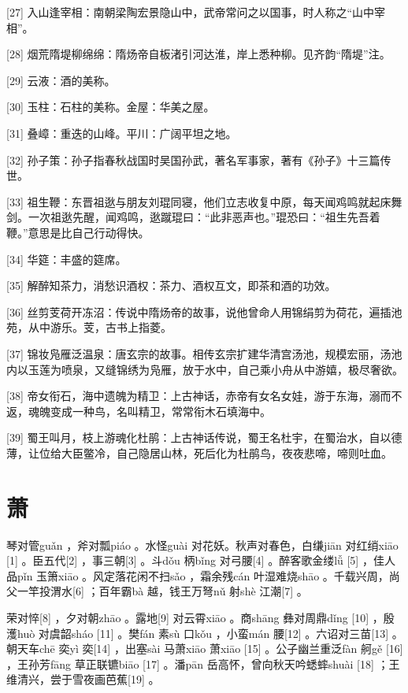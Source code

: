 \documentclass[12pt,UTF8]{ctexbook}
\begin{document}
[27] 入山逢宰相：南朝梁陶宏景隐山中，武帝常问之以国事，时人称之“山中宰相”。

[28] 烟荒隋堤柳绵绵：隋炀帝自板渚引河达淮，岸上悉种柳。见齐韵“隋堤”注。

[29] 云液：酒的美称。

[30] 玉柱：石柱的美称。金屋：华美之屋。

[31] 叠嶂：重迭的山峰。平川：广阔平坦之地。

[32] 孙子策：孙子指春秋战国时吴国孙武，著名军事家，著有《孙子》十三篇传世。

[33] 祖生鞭：东晋祖逖与朋友刘琨同寝，他们立志收复中原，每天闻鸡鸣就起床舞剑。一次祖逖先醒，闻鸡鸣，逖蹴琨曰：“此非恶声也。”琨恐曰：“祖生先吾着鞭。”意思是比自己行动得快。

[34] 华筵：丰盛的筵席。

[35] 解醉知茶力，消愁识酒权：茶力、酒权互文，即茶和酒的功效。

[36] 丝剪芰荷开冻沼：传说中隋炀帝的故事，说他曾命人用锦绢剪为荷花，遍插池苑，从中游乐。芰，古书上指菱。

[37] 锦妆凫雁泛温泉：唐玄宗的故事。相传玄宗扩建华清宫汤池，规模宏丽，汤池内以玉莲为喷泉，又缝锦绣为凫雁，放于水中，自己乘小舟从中游嬉，极尽奢欲。

[38] 帝女衔石，海中遗魄为精卫：上古神话，赤帝有女名女娃，游于东海，溺而不返，魂魄变成一种鸟，名叫精卫，常常衔木石填海中。

[39] 蜀王叫月，枝上游魂化杜鹃：上古神话传说，蜀王名杜宇，在蜀治水，自以德薄，让位给大臣鳖冷，自己隐居山林，死后化为杜鹃鸟，夜夜悲啼，啼则吐血。





\chapter{萧}


琴对管guǎn ，斧对瓢piáo 。水怪guài 对花妖。秋声对春色，白缣jiān 对红绡xiāo [1] 。臣五代[2] ，事三朝[3] 。斗dǒu 柄bǐng 对弓腰[4] 。醉客歌金缕lǚ [5] ，佳人品pǐn 玉箫xiāo 。风定落花闲不扫sǎo ，霜余残cán 叶湿难烧shāo 。千载兴周，尚父一竿投渭水[6] ；百年霸bà 越，钱王万弩nǔ 射shè 江潮[7] 。

荣对悴[8] ，夕对朝zhāo 。露地[9] 对云霄xiāo 。商shāng 彝对周鼎dǐng [10] ，殷濩huò 对虞韶sháo [11] 。樊fán 素sù 口kǒu ，小蛮mán 腰[12] 。六诏对三苗[13] 。朝天车chē 奕yì 奕[14] ，出塞sài 马萧xiāo 萧xiāo [15] 。公子幽兰重泛fàn 舸gě [16] ，王孙芳fāng 草正联镳biāo [17] 。潘pān 岳高怀，曾向秋天吟蟋蟀shuài [18] ；王维清兴，尝于雪夜画芭蕉[19] 。
\end{document}
